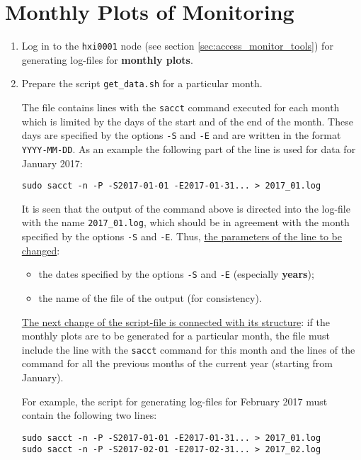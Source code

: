 \documentclass[12pt,a4paper,onecolumn]{article}
\begin{document}
\section{Monthly Plots of Monitoring}
\label{sec:monthly_plots}


\begin{enumerate}

\item Log in to the \lstinline{hxi0001} node (see section \ref{sec:access_monitor_tools}) for generating log-files for \textbf{monthly plots}.

\item Prepare the script \lstinline{get_data.sh} for a particular month.

The file contains lines with the \lstinline{sacct} command executed for each month which is limited by the days of the start and of the end of the month.
These days are specified by the options \lstinline{-S} and \lstinline{-E} and are written in the format \lstinline{YYYY-MM-DD}.
As an example the following part of the line is used for data for January 2017:
\begin{lstlisting}
sudo sacct -n -P -S2017-01-01 -E2017-01-31... > 2017_01.log
\end{lstlisting}
It is seen that the output of the command above is directed into the log-file with the name \lstinline{2017_01.log}, which should be in agreement with the month specified by the options \lstinline{-S} and \lstinline{-E}.
Thus, \underline{the parameters of the line to be changed}:
\begin{itemize}
\item the dates specified by the options \lstinline{-S} and \lstinline{-E} (especially \textbf{years});
\item the name of the file of the output (for consistency).
\end{itemize}

\underline{The next change of the script-file is connected with its structure}: if the monthly plots are to be generated for a particular month, the file must include the line with the \lstinline{sacct} command for this month and the lines of the command for all the previous months of the current year (starting from January).

For example, the script for generating log-files for February 2017 must contain the following two lines:
\begin{lstlisting}
sudo sacct -n -P -S2017-01-01 -E2017-01-31... > 2017_01.log
sudo sacct -n -P -S2017-02-01 -E2017-02-31... > 2017_02.log
\end{lstlisting}


\end{enumerate}
\end{document}
